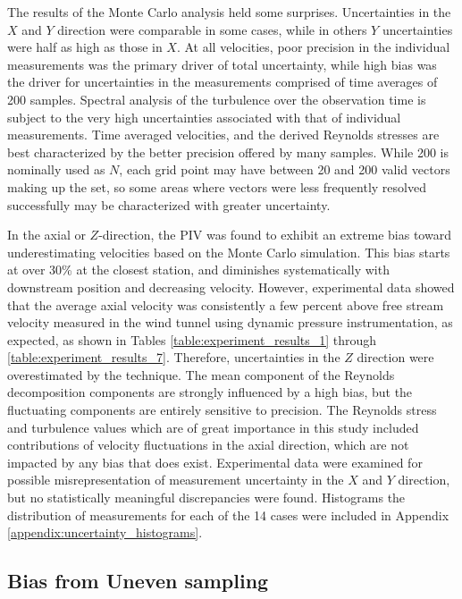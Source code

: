 {



The results of the Monte Carlo analysis held some surprises. Uncertainties in 
the $X$ and $Y$ direction were comparable in some cases, while in others $Y$ 
uncertainties were half as high as those in $X$. At all velocities, poor 
precision in the individual measurements was the primary driver of total 
uncertainty, while high bias was the driver for uncertainties in the 
measurements comprised of time averages of 200 samples. Spectral analysis of 
the turbulence over the observation time is subject to the very high 
uncertainties associated with that of individual measurements. Time averaged 
velocities, and the derived Reynolds stresses are best characterized by the 
better precision offered by many samples. While 200 is nominally used as $N$, 
each grid point may have between 20 and 200 valid vectors making up the set, so 
some areas where vectors were less frequently resolved successfully may be 
characterized with greater uncertainty.

In the axial or $Z$-direction, the PIV was found to exhibit an extreme bias 
toward underestimating velocities based on the Monte Carlo simulation. This 
bias starts at over 30\% at the closest station, and diminishes systematically 
with downstream position and decreasing velocity. However, experimental data 
showed that the average axial velocity was consistently a few percent above 
free stream velocity measured in the wind tunnel using dynamic pressure 
instrumentation, as expected, as shown in Tables 
\ref{table:experiment_results_1} through \ref{table:experiment_results_7}. 
Therefore, uncertainties in the $Z$ direction were overestimated by the 
technique. The mean component of the Reynolds decomposition components are 
strongly influenced by a high bias, but the fluctuating components are entirely 
sensitive to precision. The Reynolds stress and turbulence values which are of 
great importance in this study included contributions of velocity fluctuations 
in the axial direction, which are not impacted by any bias that does exist. 
Experimental data were examined for possible misrepresentation of measurement 
uncertainty in the $X$ and $Y$ direction, but no statistically meaningful 
discrepancies were found. Histograms the distribution of measurements for each 
of the 14 cases were included in Appendix \ref{appendix:uncertainty_histograms}.


\subsection{Bias from Uneven sampling}

}
